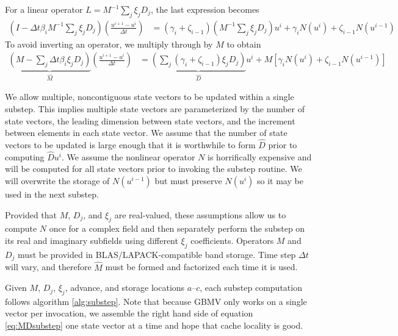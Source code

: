 \documentclass[letterpaper,reqno,11pt]{amsart}
\begin{document}
For a linear operator $L=M^{-1} \sum_{j} \xi_j D_{j}$, the last expression
becomes
\begin{align}
  \left(I-\Delta{}t\beta_{i}M^{-1}\sum_{j}\xi_{j}D_{j}\right)
  \left(\frac{u^{i+1} - u^{i}}{\Delta{}t}\right)
  &=
    \left(\gamma_i+\zeta_{i-1}\right)
      \left(M^{-1}\sum_{j}\xi_{j}D_{j}\right) u^i
  + \gamma_{i} N\left( u^{i} \right)
  + \zeta_{i-1} N\left( u^{i-1} \right)
\end{align}
To avoid inverting an operator, we multiply through by $M$ to obtain
\begin{align}
  \underbrace{
    \left(M-\sum_{j}\Delta{}t\beta_{i}\xi_{j}D_{j}\right)
  }_{\hat{M}}
  \left(\frac{u^{i+1} - u^{i}}{\Delta{}t}\right)
  &=
    \underbrace{
      \left(\sum_{j}\left(\gamma_i+\zeta_{i-1}\right)\xi_{j}D_{j}\right)
    }_{\hat{D}} u^i
  + M \left[
        \gamma_{i} N\left( u^{i} \right)
      + \zeta_{i-1} N\left( u^{i-1} \right)
    \right]
  \label{eq:MDsubstep}
\end{align}

We allow multiple, noncontiguous state vectors to be updated within a single
substep.  This implies multiple state vectors are parameterized by the number
of state vectors, the leading dimension between state vectors, and the
increment between elements in each state vector.  We assume that the number of
state vectors to be updated is large enough that it is worthwhile to form
$\hat{D}$ prior to computing $\hat{D}u^{i}$.  We assume the nonlinear operator
$N$ is horrifically expensive and will be computed for all state vectors prior
to invoking the substep routine.  We will overwrite the storage of $N\left(
u^{i-1} \right)$ but must preserve $N\left( u^i \right)$ so it may be used in
the next substep.

Provided that $M$, $D_j$, and $\xi_j$ are real-valued, these assumptions allow
us to compute $N$ once for a complex field and then separately perform the
substep on its real and imaginary subfields using different $\xi_j$
coefficients.  Operators $M$ and $D_j$ must be provided in
BLAS/LAPACK-compatible band storage.  Time step $\Delta{}t$ will vary, and
therefore $\hat{M}$ must be formed and factorized each time it is used.

Given $M$, $D_j$, $\xi_j$, advance, and storage locations $a$--$c$, each
substep computation follows algorithm \ref{alg:substep}.  Note that because
GBMV only works on a single vector per invocation, we assemble the right hand
side of equation \eqref{eq:MDsubstep} one state vector at a time and hope that
cache locality is good.
\end{document}

